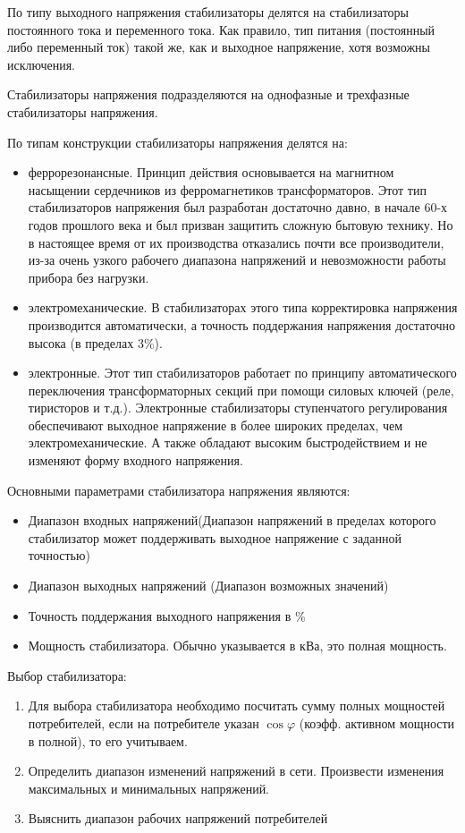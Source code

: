 \documentclass[unicode, 12pt, a4paper, oneside]{article}
\begin{document}
По типу выходного напряжения стабилизаторы делятся на стабилизаторы постоянного тока и переменного тока. Как правило, тип питания (постоянный либо переменный ток) такой же, как и выходное напряжение, хотя возможны исключения.

Стабилизаторы напряжения подразделяются на однофазные и трехфазные стабилизаторы напряжения.

По типам конструкции стабилизаторы напряжения делятся на:
\begin{itemize}
\item феррорезонансные. Принцип действия основывается на магнитном насыщении сердечников из ферромагнетиков трансформаторов. Этот тип стабилизаторов напряжения был разработан достаточно давно, в начале 60-х годов прошлого века и был призван защитить сложную бытовую технику. Но в настоящее время от их производства отказались почти все производители, из-за очень узкого рабочего диапазона напряжений и невозможности работы прибора без нагрузки.
\item электромеханические. В стабилизаторах этого типа корректировка напряжения производится автоматически, а точность поддержания напряжения достаточно высока (в пределах 3\%).
\item электронные. Этот тип стабилизаторов работает по принципу автоматического переключения трансформаторных секций при помощи силовых ключей (реле, тиристоров и т.д.). Электронные стабилизаторы ступенчатого регулирования обеспечивают выходное напряжение в более широких пределах, чем электромеханические. А также обладают высоким быстродействием и не изменяют форму входного напряжения.
\end{itemize}

Основными параметрами стабилизатора напряжения являются:
\begin{itemize}
\item Диапазон входных напряжений(Диапазон напряжений в пределах которого стабилизатор может поддерживать выходное напряжение с заданной точностью)
\item Диапазон  выходных напряжений (Диапазон возможных значений)
\item Точность поддержания выходного напряжения в \%
\item Мощность стабилизатора. Обычно указывается в кВа, это полная мощность.
\end{itemize}

Выбор стабилизатора:
\begin{enumerate}
\item Для выбора стабилизатора необходимо посчитать сумму полных мощностей потребителей, если на потребителе указан $\cos\varphi$ (коэфф. активном мощности в полной), то его учитываем.
\item Определить диапазон изменений напряжений в сети. Произвести изменения максимальных и минимальных напряжений.
\item Выяснить диапазон рабочих напряжений потребителей
\end{enumerate}
\end{document}
